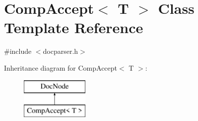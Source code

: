 \hypertarget{class_comp_accept}{}\section{Comp\+Accept$<$ T $>$ Class Template Reference}
\label{class_comp_accept}


{\ttfamily \#include $<$docparser.\+h$>$}

Inheritance diagram for Comp\+Accept$<$ T $>$\+:\begin{figure}[H]
\begin{center}
\leavevmode
\includegraphics[height=2.000000cm]{class_comp_accept}
\end{center}
\end{figure}
